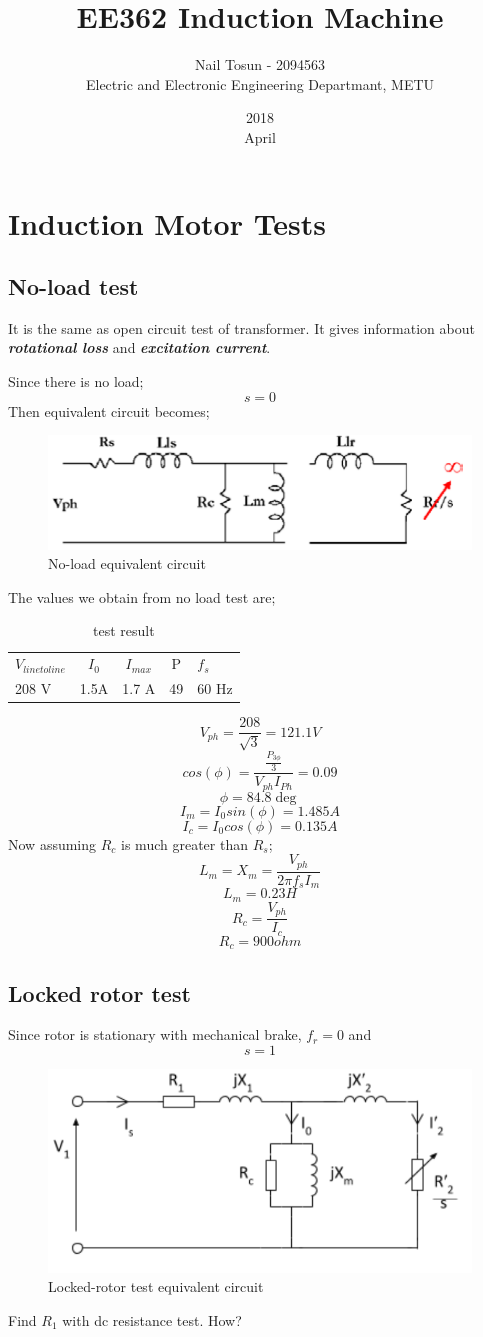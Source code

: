 \documentclass[11 pt]{article}
\title{EE362 Induction Machine}
\date{2018\\ April}
\author{Nail Tosun - 2094563 \\ Electric and Electronic Engineering Departmant, METU}
\begin{document}
\maketitle
\section*{Induction Motor Tests}
\subsection*{No-load test}
It is the same as open circuit test of transformer. It gives information about \textbf{\textit{rotational loss}} and \textbf{\textit{excitation current}}.

Since there is no load;
$$s=0$$
Then equivalent circuit becomes;
\begin{figure}[H]
\centering
  \includegraphics[scale=0.6]{no-load}
  \caption{No-load equivalent circuit}
  \label{fig:zero}
\end{figure}
The values we obtain from no load test are;
\begin{table}[]
\centering
\caption{test result}
\label{my-label}
\begin{tabular}{lcccl}
$V_{line to line}$    & $I_0$ & $I_{max}$ & P  & $f_s$ \\
208 V & 1.5A  & 1.7 A   & 49 & 60 Hz
\end{tabular}
\end{table}
\[V_{ph}=\frac{208}{\sqrt{3}}=121.1 V\]
\[cos(\phi)=\frac{\frac{P_{3\phi}}{3}}{V_{ph} I_{Ph}}=0.09\]
\[\phi=84.8\deg\]
\[I_m=I_0 sin(\phi)=1.485 A\]
\[I_c=I_0 cos(\phi)=0.135 A\]
Now assuming $R_c$ is much greater than $R_s$;
\[L_m=X_m=\frac{V_{ph}}{2\pi f_sI_m}\]
\[L_m=0.23H\]
\[R_c=\frac{V_{ph}}{I_c}\]
\[R_c=900 ohm\]
\subsection*{Locked rotor test}
Since rotor is stationary with mechanical brake, $f_r=0$ and 
$$s=1$$
\begin{figure}[H]
\centering
  \includegraphics[scale=0.6]{locked}
  \caption{Locked-rotor test equivalent circuit}
  \label{fig:zero}
\end{figure}
Find $R_1$ with dc resistance test. How?
\end{document}
